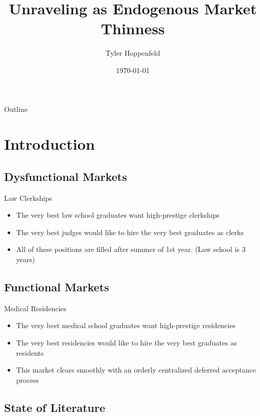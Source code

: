 \documentclass{beamer}
\title[Unraveling]{Unraveling as Endogenous Market Thinness}
\author{Tyler Hoppenfeld}
\institute{UC Davis}
\date{\today}
\begin{document}
\begin{frame}
  \titlepage
\end{frame}

\begin{frame}{Outline}
  \tableofcontents
\end{frame}

\section{Introduction}
\subsection{Dysfunctional Markets}
\begin{frame}{Law Clerkships}

\begin{itemize}
  \item The very best law school graduates want high-prestige clerkships
  \item The very best judges would like to hire the very best graduates as clerks
  \item All of these positions are filled after summer of 1st year. (Law school is 3 years)
\end{itemize}

\end{frame}

\subsection{Functional Markets}
\begin{frame}{Medical Residencies}

\begin{itemize}
\item The very best medical school graduates want high-prestige residencies
\item The very best residencies would like to hire the very best graduates as residents
\item This market clears smoothly with an orderly centralized deferred acceptance process
\end{itemize}
\end{frame}


\subsection{State of Literature}
\end{document}
